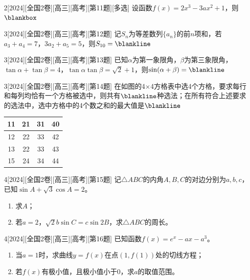 \begin{example}{2}[2024][全国2卷][高三][高考][第11题][多选]
设函数$f(x)=2x^3-3ax^2+1$，则$\blankbox$
\begin{choices}
\end{choices}
\end{example}
\begin{example}{3}[2024][全国2卷][高三][高考][第12题]
记$S_n$为等差数列$\{a_n\}$的前$n$项和，若$a_3+a_4=7$，$3a_2+a_5=5$，则$S_{10}=\blankline$
\end{example}

\begin{example}{3}[2024][全国2卷][高三][高考][第13题]
已知$\alpha$为第一象限角，$\beta$为第三象限角，$\tan\alpha+\tan\beta=4$，$\tan\alpha\tan\beta=\sqrt{2}+1$，则$\sin(\alpha+\beta)=\blankline$
\end{example}

\begin{example}{3}[2024][全国2卷][高三][高考][第14题]
在如图的4×4方格表中选4个方格，要求每行和每列均恰有一个方格被选中，则共有$\blankline$种选法；在所有符合上述要求的选法中，选中方格中的4个数之和的最大值是$\blankline$
\begin{center}
\begin{tabular}{|c|c|c|c|}
\hline
11 & 21 & 31 & 40 \\
\hline
12 & 22 & 33 & 42 \\
\hline
13 & 22 & 33 & 43 \\
\hline
15 & 24 & 34 & 44 \\
\hline
\end{tabular}
\end{center}
\end{example}
\begin{example}{4}[2024][全国2卷][高三][高考][第15题]
记$\triangle ABC$的内角$A,B,C$的对边分别为$a,b,c$，已知$\sin A+\sqrt{3}\cos A=2$。
\begin{enumerate}
\item 求$A$；
\item 若$a=2$，$\sqrt{2}b\sin C=c\sin 2B$，求$\triangle ABC$的周长。
\end{enumerate}
\end{example}

\begin{example}{4}[2024][全国2卷][高三][高考][第16题]
已知函数$f(x)=e^x-ax-a^3$。
\begin{enumerate}
\item 当$a=1$时，求曲线$y=f(x)$在点$(1,f(1))$处的切线方程；
\item 若$f(x)$有极小值，且极小值小于0，求$a$的取值范围。
\end{enumerate}
\end{example}

